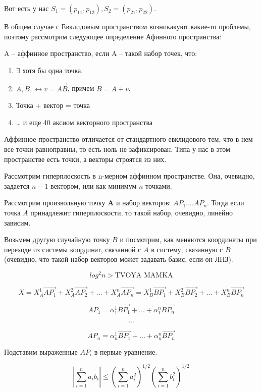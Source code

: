 \documentclass[11pt]{article}
\newcommand{\vect}{\overrightarrow}
\begin{document}
Вот есть у нас $S_{1}=(p_{11},p_{12}), S_{2}=(p_{21},p_{22})$.

В общем случае с Евклидовым пространством возникакуют какие-то
проблемы, поэтому рассмотрим следующее определение Афинного
пространства:

A -- аффинное пространство, если A -- такой набор точек, что:
\begin{enumerate}
\item $\exists$ хотя бы одна точка.
\item $A, B, \leftrightarrow v = \overrightarrow{A B}$, причем $B = A + v$.
\item Точка + вектор = точка
\item \ldots{} и еще 40 аксиом векторного пространства
\end{enumerate}

Аффинное пространство отличается от стандартного евклидового тем,
что в нем все точки равноправны, то есть ноль не зафиксирован. Типа
у нас в этом пространстве есть точки, а векторы строятся из них.

Рассмотрим гиперплоскость в n-мерном аффинном пространстве. Она,
очевидно, задается $n-1$ вектором, или как минимум $n$ точками.

Рассмотрим произвольную точку \textbf{A} и набор векторов: $AP_1....AP_n$. Тогда
если точка $A$ принадлежит гиперплоскости, то такой набор, очевидно,
линейно зависим.

Возьмем другую случайную точку $B$ и посмотрим, как меняются
координаты при переходе из системы координат, связанной с $A$ в
систему, связанную с $B$ (очевидно, что такой набор векторов может
задавать базис, если он ЛНЗ).

\[ log^2{n} > \text{TVOYA MAMKA} \]

\[
  X = X_A^1\vect{A P_1} +
      X_A^2\vect{A P_2} +
      ... +
      X_A^n\vect{A P_n}
    = X_B^1\vect{B P_1} +
      X_B^2\vect{B P_2} +
      ... +
      X_B^n\vect{B P_n}
  \]


\[
  AP_1 = \alpha_1^1\vect{B P_1} +
         ... +
         \alpha_1^n\vect{B P_n}
  \]

\[ ... \]

\[
  AP_n = \alpha_n^1\vect{B P_1} +
         ... +
         \alpha_n^n\vect{B P_n}
  \]

Подставим выраженные $AP_i$ в первые уравнение.


\[
  \left|\sum_{i=1}^n a_ib_i\right|
  \le
  \left(\sum_{i=1}^n a_i^2\right)^{1/2}
  \left(\sum_{i=1}^n b_i^2\right)^{1/2}
  \]
\end{document}

